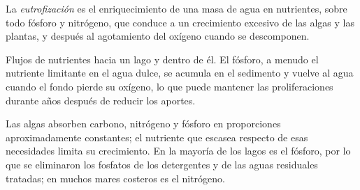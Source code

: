 \begin{definition}[Eutrofización]\label{def:b3:environmental-toxicology:eutrophication}
La \emph{eutrofización} es el enriquecimiento de una masa de agua
en nutrientes, sobre todo fósforo y nitrógeno, que conduce a un crecimiento excesivo de las
algas y las plantas, y después al agotamiento del oxígeno cuando se descomponen.
\end{definition}

\begin{omfigure}

{\small Flujos de nutrientes hacia un lago y dentro de él. El fósforo, a menudo el nutriente
limitante en el agua dulce, se acumula en el sedimento y vuelve al agua
cuando el fondo pierde su oxígeno, lo que puede mantener las proliferaciones durante años después de
reducir los aportes.}
\end{omfigure}

Las algas absorben carbono, nitrógeno y fósforo en proporciones aproximadamente constantes;
el nutriente que escasea respecto de esas necesidades limita su crecimiento. En
la mayoría de los lagos es el fósforo, por lo que se eliminaron los fosfatos de los
detergentes y de las aguas residuales tratadas; en muchos mares costeros es el nitrógeno.

